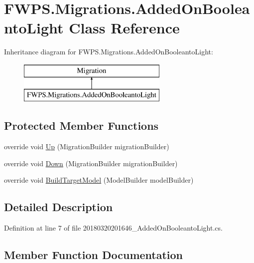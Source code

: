 \hypertarget{class_f_w_p_s_1_1_migrations_1_1_added_on_booleanto_light}{}\section{F\+W\+P\+S.\+Migrations.\+Added\+On\+Booleanto\+Light Class Reference}
\label{class_f_w_p_s_1_1_migrations_1_1_added_on_booleanto_light}
Inheritance diagram for F\+W\+P\+S.\+Migrations.\+Added\+On\+Booleanto\+Light\+:\begin{figure}[H]
\begin{center}
\leavevmode
\includegraphics[height=2.000000cm]{class_f_w_p_s_1_1_migrations_1_1_added_on_booleanto_light}
\end{center}
\end{figure}
\subsection*{Protected Member Functions}
\begin{DoxyCompactItemize}
\item 
override void \mbox{\hyperlink{class_f_w_p_s_1_1_migrations_1_1_added_on_booleanto_light_aa13a9e8241c65179b3bf65aa13b1a9df}{Up}} (Migration\+Builder migration\+Builder)
\item 
override void \mbox{\hyperlink{class_f_w_p_s_1_1_migrations_1_1_added_on_booleanto_light_aa624fe27e11753cdde275f3ea550f330}{Down}} (Migration\+Builder migration\+Builder)
\item 
override void \mbox{\hyperlink{class_f_w_p_s_1_1_migrations_1_1_added_on_booleanto_light_ac74390cc23d80da6815214b3c85a1683}{Build\+Target\+Model}} (Model\+Builder model\+Builder)
\end{DoxyCompactItemize}


\subsection{Detailed Description}


Definition at line 7 of file 20180320201646\+\_\+\+Added\+On\+Booleanto\+Light.\+cs.



\subsection{Member Function Documentation}
\mbox{\label{class_f_w_p_s_1_1_migrations_1_1_added_on_booleanto_light_ac74390cc23d80da6815214b3c85a1683}} 
